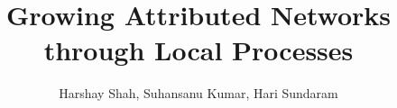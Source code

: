 \documentclass[sigconf]{acmart}
\begin{document}
\title{Growing Attributed Networks through Local Processes}

\author{Harshay Shah, Suhansanu Kumar, Hari Sundaram}

\renewcommand{\shortauthors}{Shah et al.}

\begin{abstract}

\end{abstract}


\maketitle

















\clearpage


\end{document}
